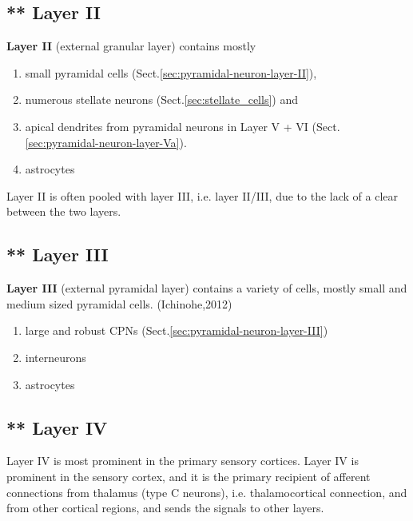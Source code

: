 
  
\subsection{** Layer II}
\label{sec:layer-II}

{\bf Layer II} (external granular layer) contains mostly 
\begin{enumerate}
  \item small pyramidal
cells (Sect.\ref{sec:pyramidal-neuron-layer-II}), 

  \item numerous stellate neurons
(Sect.\ref{sec:stellate_cells}) and 

  \item apical dendrites from pyramidal neurons in Layer V + VI
  (Sect.\ref{sec:pyramidal-neuron-layer-Va}).

  \item astrocytes
\end{enumerate}
  
Layer II is often pooled with layer III, i.e. layer II/III, due to the lack of a
clear between the two layers.
  
\subsection{** Layer III}
\label{sec:layer-III}

{\bf Layer III} (external pyramidal layer) contains a variety of cells,
mostly small and medium sized pyramidal cells. (Ichinohe,2012)
\begin{enumerate}
  \item large and robust CPNs (Sect.\ref{sec:pyramidal-neuron-layer-III})
  \item interneurons
  \item astrocytes
\end{enumerate}

\subsection{** Layer IV}
\label{sec:layer-IV}


Layer IV is most prominent in the primary sensory cortices. Layer IV is
prominent in the sensory cortex, and it is the primary recipient of afferent
connections from thalamus (type C neurons), i.e.
thalamocortical connection, \citep{miller2001} and from other cortical regions,
and sends the signals to other layers.

